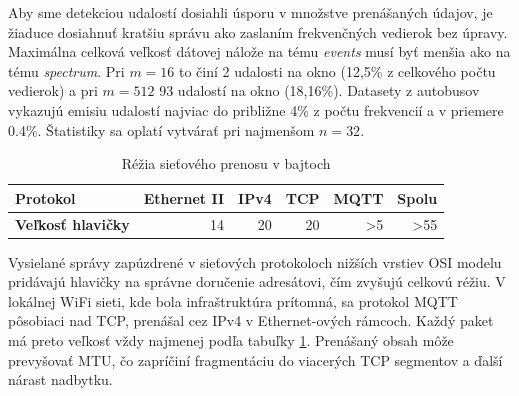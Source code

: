 Aby sme detekciou udalostí dosiahli úsporu v množstve prenášaných údajov, je žiaduce dosiahnuť kratšiu správu ako
zaslaním frekvenčných vedierok bez úpravy. Maximálna celková veľkosť dátovej nálože na tému \emph{events} musí byť menšia
ako na tému \emph{spectrum}. Pri $m = 16$ to činí 2 udalosti na okno (12,5\% z celkového počtu vedierok) a pri $m = 512$
93 udalostí na okno (18,16\%). Datasety z autobusov vykazujú emisiu udalostí najviac do približne 4\% z počtu frekvencií
a v priemere 0.4\%. Štatistiky sa oplatí vytvárať pri najmenšom $n = 32$.

\begin{table}[h]
\def\arraystretch{1.25}
\centering
\begin{tabular}{|l|r|r|r|r|r|}
\hline
\textbf{Protokol}         & \textbf{Ethernet II} & \textbf{IPv4} & \textbf{TCP} & \textbf{MQTT}  & \textbf{Spolu}  \\ \hline
\textbf{Veľkosť hlavičky} & 14                   & 20            & 20           & \textgreater 5 & \textgreater 55 \\ \hline
\end{tabular}
\caption{Réžia sieťového prenosu v bajtoch}
\label{tab:net-overhead}
\end{table}

Vysielané správy zapúzdrené v sieťových protokoloch nižších vrstiev OSI modelu pridávajú
hlavičky na správne doručenie adresátovi, čím zvyšujú celkovú réžiu. V lokálnej WiFi sieti, kde bola infraštruktúra prítomná,
sa protokol MQTT pôsobiaci nad TCP, prenášal cez IPv4 v Ethernet-ových rámcoch. Každý paket má preto veľkosť vždy najmenej
podľa tabuľky \ref{tab:net-overhead}. Prenášaný obsah môže prevyšovať MTU, čo zapríčiní fragmentáciu do viacerých TCP segmentov
a ďalší nárast nadbytku.


